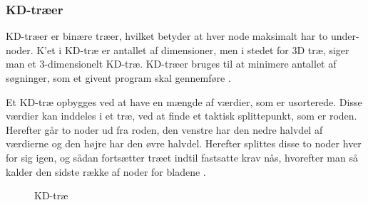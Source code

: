 \subsubsection{KD-træer}
\label{sec:kdtree}

KD-træer er binære træer, hvilket betyder at hver node maksimalt har to under-noder. K'et i KD-træ er antallet af dimensioner, men i stedet for 3D træ, siger man et 3-dimensionelt KD-træ. KD-træer bruges til at minimere antallet af søgninger, som et givent program skal gennemføre \cite{kdtreekilde}. 

Et KD-træ opbygges ved at have en mængde af værdier, som er usorterede. Disse værdier kan inddeles i et træ, ved at finde et taktisk splittepunkt, som er roden. Herefter går to noder ud fra roden, den venstre har den nedre halvdel af værdierne og den højre har den øvre halvdel. Herefter splittes disse to noder hver for sig igen, og sådan fortsætter træet indtil fastsatte krav nås, hvorefter man så kalder den sidste række af noder for bladene \cite{kdtreekilde}. 

\begin{figure}[H]
  \centering
  \caption{KD-træ}
  \label{fig:kd-tree}
\end{figure}

